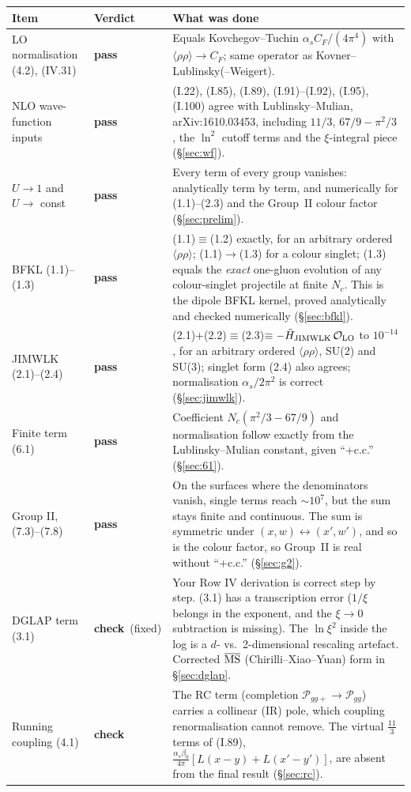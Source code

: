 \documentclass[10pt]{article}
\newcommand{\ok}{\textcolor{green!45!black}{\textbf{pass}}}
\newcommand{\warn}{\textcolor{orange!85!black}{\textbf{check}}}
\begin{document}
\begin{longtable}{p{4.3cm}p{1.6cm}p{9.6cm}}
\toprule
\textbf{Item} & \textbf{Verdict} & \textbf{What was done} \\
\midrule
LO normalisation (4.2), (IV.31) & \ok & Equals Kovchegov--Tuchin $\alpha_s C_F/(4\pi^4)$ with $\langle\rho\rho\rangle\to C_F$; same operator as Kovner--Lublinsky(--Weigert). \\
NLO wave-function inputs & \ok & (I.22), (I.85), (I.89), (I.91)--(I.92), (I.95), (I.100) agree with Lublinsky--Mulian, arXiv:1610.03453, including $11/3$, $67/9-\pi^2/3$, the $\ln^2$ cutoff terms and the $\xi$-integral piece (\S\ref{sec:wf}). \\
$U\to1$ and $U\to$ const & \ok & Every term of every group vanishes: analytically term by term, and numerically for (1.1)--(2.3) and the Group~II colour factor (\S\ref{sec:prelim}). \\
BFKL (1.1)--(1.3) & \ok & (1.1)$\equiv$(1.2) exactly, for an arbitrary ordered $\langle\rho\rho\rangle$; (1.1)$\to$(1.3) for a colour singlet; (1.3) equals the \emph{exact} one-gluon evolution of any colour-singlet projectile at finite $N_c$. This is the dipole BFKL kernel, proved analytically and checked numerically (\S\ref{sec:bfkl}). \\
JIMWLK (2.1)--(2.4) & \ok & (2.1)+(2.2)$\equiv$(2.3)$\equiv-\tilde H_{\rm JIMWLK}\,\mathcal O_{\rm LO}$ to $10^{-14}$, for an arbitrary ordered $\langle\rho\rho\rangle$, SU(2) and SU(3); singlet form (2.4) also agrees; normalisation $\alpha_s/2\pi^2$ is correct (\S\ref{sec:jimwlk}). \\
Finite term (6.1) & \ok & Coefficient $N_c(\pi^2/3-67/9)$ and normalisation follow exactly from the Lublinsky--Mulian constant, given ``+c.c.'' (\S\ref{sec:61}). \\
Group II, (7.3)--(7.8) & \ok & On the surfaces where the denominators vanish, single terms reach $\sim10^7$, but the sum stays finite and continuous. The sum is symmetric under $(x,w)\leftrightarrow(x',w')$, and so is the colour factor, so Group~II is real without ``+c.c.'' (\S\ref{sec:g2}). \\
DGLAP term (3.1) & \warn\ (fixed) & Your Row IV derivation is correct step by step. (3.1) has a transcription error ($1/\xi$ belongs in the exponent, and the $\xi\to0$ subtraction is missing). The $\ln\xi^2$ inside the log is a $d$- vs.\ 2-dimensional rescaling artefact. Corrected $\overline{\rm MS}$ (Chirilli--Xiao--Yuan) form in \S\ref{sec:dglap}. \\
Running coupling (4.1) & \warn & The RC term (completion $\mathcal P_{gg+}\to\mathcal P_{gg}$) carries a collinear (IR) pole, which coupling renormalisation cannot remove. The virtual $\frac{11}{3}$ terms of (I.89), $\frac{\alpha_s\beta_0}{4\pi}[L(x-y)+L(x'-y')]$, are absent from the final result (\S\ref{sec:rc}). \\

\end{longtable}
\end{document}
